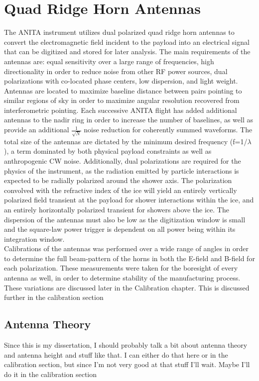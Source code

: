\section{Quad Ridge Horn Antennas}
	The ANITA instrument utilizes dual polarized quad ridge horn antennas to convert the electromagnetic field incident to the payload into an electrical signal that can be digitized and stored for later analysis.  The main requirements of the antennas are: equal sensitivity over a large range of frequencies, high directionality in order to reduce noise from other RF power sources, dual polarizations with co-located phase centers, low dispersion, and light weight.  \\
	Antennas are located to maximize baseline distance between pairs pointing to similar regions of sky in order to maximize angular resolution recovered from interferometric pointing.  Each successive ANITA flight has added additional antennas to the nadir ring in order to increase the number of baselines, as well as provide an additional $\frac{1}{\sqrt{N}}$ noise reduction for coherently summed waveforms.  The total size of the antennas are dictated by the minimum desired frequency (f=1/$\lambda$), a term dominated by both physical payload constraints as well as anthropogenic CW noise.  Additionally, dual polarizations are required for the physics of the instrument, as the radiation emitted by particle interactions is expected to be radially polarized around the shower axis.  The polarization convolved with the refractive index of the ice will yield an entirely vertically polarized field transient at the payload for shower interactions within the ice, and an entirely horizontally polarized transient for showers above the ice.  The dispersion of the antennas must also be low as the digitization window is small and the square-law power trigger is dependent on all power being within its integration window. \\
	Calibrations of the antennas was performed over a wide range of angles in order to determine the full beam-pattern of the horns in both the E-field and B-field for each polarization.  These measurements were taken for the boresight of every antenna as well, in order to determine stability of the manufacturing process.  These variations are discussed later in the Calibration chapter.
	This is discussed further in the calibration section
	\subsection{Antenna Theory}
		Since this is my dissertation, I should probably talk a bit about antenna theory and antenna height and stuff like that.  I can either do that here or in the calibration section, but since I'm not very good at that stuff I'll wait.  Maybe I'll do it in the calibration section
